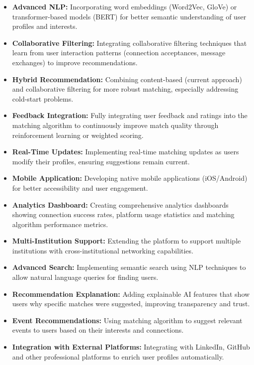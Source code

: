 \documentclass[12pt,a4paper]{report}
\begin{document}
\begin{itemize}[noitemsep]
    \item \textbf{Advanced NLP:} Incorporating word embeddings (Word2Vec, GloVe) or transformer-based models (BERT) for better semantic understanding of user profiles and interests.
    \item \textbf{Collaborative Filtering:} Integrating collaborative filtering techniques that learn from user interaction patterns (connection acceptances, message exchanges) to improve recommendations.
    \item \textbf{Hybrid Recommendation:} Combining content-based (current approach) and collaborative filtering for more robust matching, especially addressing cold-start problems.
    \item \textbf{Feedback Integration:} Fully integrating user feedback and ratings into the matching algorithm to continuously improve match quality through reinforcement learning or weighted scoring.
    \item \textbf{Real-Time Updates:} Implementing real-time matching updates as users modify their profiles, ensuring suggestions remain current.
    \item \textbf{Mobile Application:} Developing native mobile applications (iOS/Android) for better accessibility and user engagement.
    \item \textbf{Analytics Dashboard:} Creating comprehensive analytics dashboards showing connection success rates, platform usage statistics and matching algorithm performance metrics.
    \item \textbf{Multi-Institution Support:} Extending the platform to support multiple institutions with cross-institutional networking capabilities.
    \item \textbf{Advanced Search:} Implementing semantic search using NLP techniques to allow natural language queries for finding users.
    \item \textbf{Recommendation Explanation:} Adding explainable AI features that show users why specific matches were suggested, improving transparency and trust.
    \item \textbf{Event Recommendations:} Using matching algorithm to suggest relevant events to users based on their interests and connections.
    \item \textbf{Integration with External Platforms:} Integrating with LinkedIn, GitHub and other professional platforms to enrich user profiles automatically.
\end{itemize}
\end{document}
